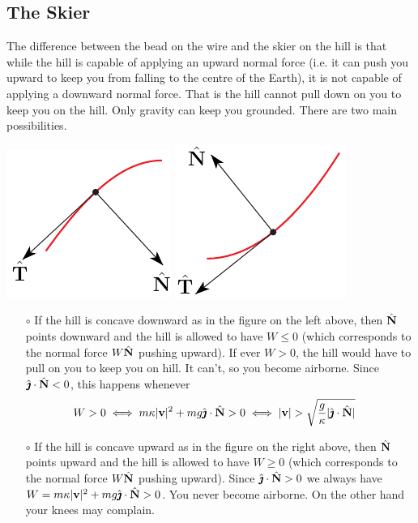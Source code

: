 \subsection*{The Skier}
The difference between the bead on the wire and the skier on
the hill is that while the hill is capable of applying an upward normal
force (i.e. it can push you upward to keep you from falling to 
the centre of the Earth), it is not capable of applying a downward 
normal force. That is the hill cannot pull down on you to keep you 
on the hill. Only gravity can keep you grounded. There are two 
main possibilities.

\begin{efig}
\begin{center}
    \includegraphics{wireD.pdf} \qquad\qquad
    \includegraphics{wireU.pdf}
\end{center}
\end{efig}


\begin{itemize}\itemsep1pt \parskip0pt  %
\item[$\circ$]
If the hill is concave downward as in the figure
on the left above, then $\hat{\mathbf{N}}$ points downward and the hill is 
allowed to have
$W\le 0$ (which corresponds to the normal force $W\hat{\mathbf{N}}$ pushing upward). 
If ever $W>0$, the hill would have to pull on you to keep you on hill. 
It can't, so you become airborne. Since $\hat{\pmb{\jmath}}\cdot \hat{\mathbf{N}}<0$, this happens
whenever 
\begin{align*}
W>0 &\iff m\kappa|\mathbf{v}|^2+mg\hat{\pmb{\jmath}}\cdot \hat{\mathbf{N}} >0 
    \iff |\mathbf{v}| > \sqrt{\frac{g}{\kappa}|\hat{\pmb{\jmath}}\cdot \hat{\mathbf{N}}|}
\end{align*}

\item[$\circ$] 
If the hill is concave upward as in the figure
on the right above, then $\hat{\mathbf{N}}$ points upward and the hill is 
allowed to have $W\ge 0$ (which corresponds to the normal force 
$W\hat{\mathbf{N}}$ pushing upward). Since $\hat{\pmb{\jmath}}\cdot \hat{\mathbf{N}}>0$ we always 
have $W=m\kappa|\mathbf{v}|^2+mg\hat{\pmb{\jmath}}\cdot \hat{\mathbf{N}} > 0$.
You never become airborne. On the other hand your knees may complain.
\end{itemize}


